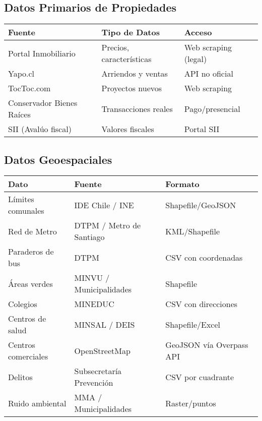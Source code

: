 \documentclass[11pt,a4paper]{article}
\begin{document}
\subsection{Datos Primarios de Propiedades}

\begin{table}[h]
\centering
\begin{tabular}{lll}
\toprule
\textbf{Fuente} & \textbf{Tipo de Datos} & \textbf{Acceso} \\
\midrule
Portal Inmobiliario & Precios, características & Web scraping (legal) \\
Yapo.cl & Arriendos y ventas & API no oficial \\
TocToc.com & Proyectos nuevos & Web scraping \\
Conservador Bienes Raíces & Transacciones reales & Pago/presencial \\
SII (Avalúo fiscal) & Valores fiscales & Portal SII \\
\bottomrule
\end{tabular}
\end{table}

\subsection{Datos Geoespaciales}

\begin{table}[h]
\centering
\small
\begin{tabular}{p{4cm}p{5cm}p{4cm}}
\toprule
\textbf{Dato} & \textbf{Fuente} & \textbf{Formato} \\
\midrule
Límites comunales & IDE Chile / INE & Shapefile/GeoJSON \\
Red de Metro & DTPM / Metro de Santiago & KML/Shapefile \\
Paraderos de bus & DTPM & CSV con coordenadas \\
Áreas verdes & MINVU / Municipalidades & Shapefile \\
Colegios & MINEDUC & CSV con direcciones \\
Centros de salud & MINSAL / DEIS & Shapefile/Excel \\
Centros comerciales & OpenStreetMap & GeoJSON vía Overpass API \\
Delitos & Subsecretaría Prevención & CSV por cuadrante \\
Ruido ambiental & MMA / Municipalidades & Raster/puntos \\
\bottomrule
\end{tabular}
\end{table}
\end{document}
